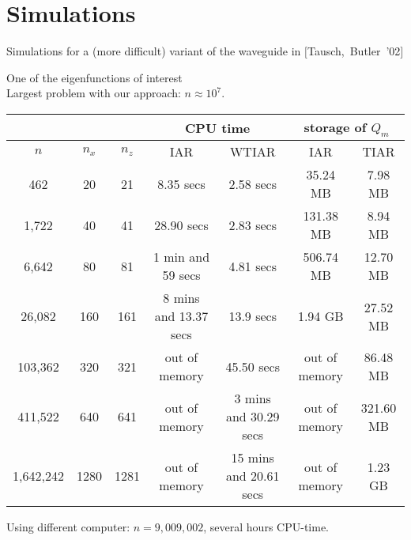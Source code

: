 \documentclass{beamer}
\newcommand{\mycite}[1]{$[$#1$]$}
\begin{document}
\section{Simulations}
\begin{frame}
Simulations for a (more difficult) variant of the waveguide in \mycite{Tausch,~Butler~'02}
\begin{center}%
%
\end{center}
One of the eigenfunctions of interest
\\

\hfill Largest problem with our approach: $n\approx 10^7$.
\end{frame}



\begin{frame}[plain]%
%
%

\vspace{-0.5cm}
 \begin{center}
   \resizebox{12cm}{!} {
    \begin{tabular}{c|c|c|c|c|c|c|}
     \cline{4-7}
		\multicolumn{3}{c}{}		&	 \multicolumn{2}{|c|}{CPU time } 			&	\multicolumn{2}{|c|}{storage of $Q_m$} 		\\
\hline
\multicolumn{1}{|c|}{$n$}		&	$n_x$	&	$n_z$	&	  IAR				&				WTIAR&	 		IAR 		&	 TIAR				\\
\hline
\multicolumn{1}{|c|}{462}		&	20	&	21	& 	 8.35 secs			&		2.58 secs		&		35.24 MB	&	7.98 MB				\\
\hline
\multicolumn{1}{|c|}{1,722}		&	40	&	41	& 	 28.90 secs			&		2.83 secs		&		131.38 MB	&	8.94 MB				\\
\hline
\multicolumn{1}{|c|}{6,642}		&	80	&	81	& 	1 min and 59 secs		&		4.81 secs		&		506.74 MB	&	12.70 MB			\\
\hline
\multicolumn{1}{|c|}{26,082}		&	160	&	161	& 	8 mins and 13.37 secs		&		13.9 secs		&		1.94 GB		&	27.52 MB			\\
\hline
\multicolumn{1}{|c|}{103,362}		&	320	&	321	& 	out of memory			&		45.50 secs		&		out of memory	&	86.48 MB			\\
\hline
\multicolumn{1}{|c|}{411,522}		&	640	&	641	& 	out of memory			&		3 mins and 30.29 secs	&		out of memory	&	321.60 MB			\\
\hline
\multicolumn{1}{|c|}{1,642,242}		&	1280	&	1281	& 	out of memory			&		15 mins and 20.61 secs	&		out of memory	&	1.23 GB				\\
\hline
\end{tabular}
}
 \end{center}
{\small 
Using different computer: 
$n=9,009,002$, several hours CPU-time.}

\end{frame}
\end{document}
